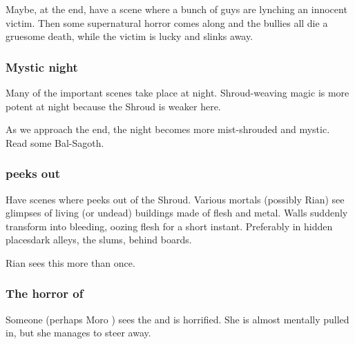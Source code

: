 Maybe, at the end, have a scene where a bunch of guys are lynching an innocent victim. Then some supernatural horror comes along and the bullies all die a gruesome death, while the victim is lucky and slinks away. 






\subsubsection{Mystic night}
Many of the important scenes take place at night.
Shroud-weaving magic is more potent at night because the Shroud is weaker here. 

As we approach the end, the \Malcuric night becomes more mist-shrouded and mystic. 
Read some Bal-Sagoth.





\subsubsection{\Nithdornazsh peeks out}
Have scenes where \Nithdornazsh{} peeks out of the Shroud. 
Various mortals (possibly Rian) see glimpses of living (or undead) buildings made of flesh and metal. 
Walls suddenly transform into bleeding, oozing flesh for a short instant. 
Preferably in hidden places\dash dark alleys, the slums, behind boards.

Rian sees this more than once. 





\subsubsection{The horror of \Nithdornazsh}
Someone (perhaps Moro \Cobrel) sees the  and is horrified. 
She is almost mentally pulled in, but she manages to steer away. 

